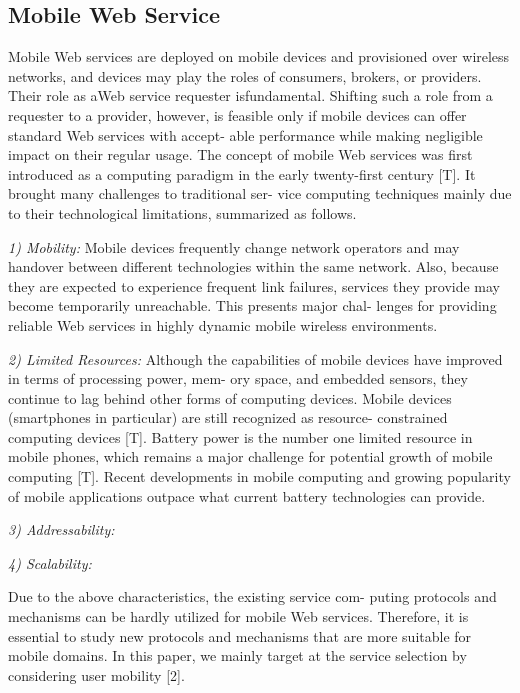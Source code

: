 \documentclass[10pt,journal,compsoc]{IEEEtran}
\begin{document}
 

\subsection{Mobile Web Service}
Mobile Web services are deployed on mobile devices and
provisioned over wireless networks, and devices may play the roles of consumers, brokers, or providers. Their role as aWeb service requester isfundamental. Shifting such a role from a requester to a provider, however, is feasible only if mobile devices can offer standard Web services with accept- able performance while making negligible impact on their regular usage. The concept of mobile Web services was first introduced as a computing paradigm in the early twenty-first century [T]. It brought many challenges to traditional ser- vice computing techniques mainly due to their technological limitations, summarized as follows.


\emph{1) Mobility:} Mobile devices frequently change network operators and may handover between different technologies within the same network. Also, because they are expected to experience frequent link failures, services they provide may become temporarily unreachable. This presents major chal- lenges for providing reliable Web services in highly dynamic mobile wireless environments. 

\emph{2) Limited Resources:} Although the capabilities of mobile devices have improved in terms of processing power, mem- ory space, and embedded sensors, they continue to lag behind other forms of computing devices. Mobile devices (smartphones in particular) are still recognized as resource- constrained computing devices [T]. Battery power is the number one limited resource in mobile phones, which remains a major challenge for potential growth of mobile computing [T]. Recent developments in mobile computing and growing popularity of mobile applications outpace what current battery technologies can provide.

\emph{3) Addressability:} 

\emph{4) Scalability:} 

Due to the above characteristics, the existing service com-
puting protocols and mechanisms can be hardly utilized for mobile Web services. Therefore, it is essential to study new protocols and mechanisms that are more suitable for mobile domains. In this paper, we mainly target at the service selection by considering user mobility [2].
\end{document}
